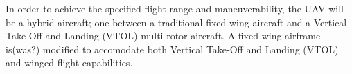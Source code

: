 In order to achieve the specified flight range and maneuverability, the UAV will be a hybrid aircraft; one between a traditional fixed-wing aircraft and a Vertical Take‐Off and Landing (VTOL) multi-rotor aircraft. A fixed‐wing airframe is(was?) modified to accomodate both Vertical Take‐Off and Landing (VTOL) and winged flight capabilities.
